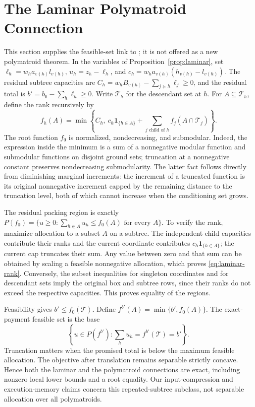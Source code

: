 \section{The Laminar Polymatroid Connection}\label{ec:polymatroid}
This section supplies the feasible-set link to \citet{FedergruenGroenevelt1986,Groenevelt1991}; it is not offered as a new polymatroid theorem. In the variables of Proposition~\ref{prop:laminar}, set $\ell_h=w_ha_{v(h)}l_{v(h)}$, $u_h=z_h-\ell_h$, and $c_h=w_ha_{v(h)}(h_{v(h)}-l_{v(h)})$. The residual subtree capacities are $C_h=w_hB_{v(h)}-\sum_{j\succeq h}\ell_j\geq0$, and the residual total is $b'=b_0-\sum_h\ell_h\geq0$. Write $\mathcal T_h$ for the descendant set at $h$. For $A\subseteq\mathcal T_h$, define the rank recursively by
\begin{equation}\label{eq:laminar-rank}
 f_h(A)=\min\left\{C_h,\ c_h\mathbf1_{\{h\in A\}}+
                   \sum_{j\text{ child of }h}f_j(A\cap\mathcal T_j)\right\}.
\end{equation}
The root function $f_0$ is normalized, nondecreasing, and submodular. Indeed, the expression inside the minimum is a sum of a nonnegative modular function and submodular functions on disjoint ground sets; truncation at a nonnegative constant preserves nondecreasing submodularity. The latter fact follows directly from diminishing marginal increments: the increment of a truncated function is its original nonnegative increment capped by the remaining distance to the truncation level, both of which cannot increase when the conditioning set grows.

The residual packing region is exactly $P(f_0)=\{u\geq0:\sum_{h\in A}u_h\leq f_0(A)\text{ for every }A\}$. To verify the rank, maximize allocation to a subset $A$ on a subtree. The independent child capacities contribute their ranks and the current coordinate contributes $c_h\mathbf1_{\{h\in A\}}$; the current cap truncates their sum. Any value between zero and that sum can be obtained by scaling a feasible nonnegative allocation, which proves \eqref{eq:laminar-rank}. Conversely, the subset inequalities for singleton coordinates and for descendant sets imply the original box and subtree rows, since their ranks do not exceed the respective capacities. This proves equality of the regions.

Feasibility gives $b'\leq f_0(\mathcal T)$. Define $f^{b'}(A)=\min\{b',f_0(A)\}$. The exact-payment feasible set is the base
\[
 \left\{u\in P(f^{b'}):\sum_hu_h=f^{b'}(\mathcal T)=b'\right\}.
\]
Truncation matters when the promised total is below the maximum feasible allocation. The objective after translation remains separable strictly concave. Hence both the laminar and the polymatroid connections are exact, including nonzero local lower bounds and a root equality. Our input-compression and execution-memory claims concern this repeated-subtree subclass, not separable allocation over all polymatroids.

